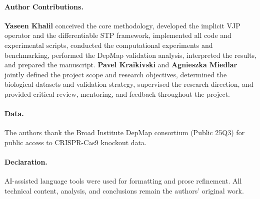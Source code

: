 \documentclass[11pt,a4paper]{article}
\begin{document}
\paragraph{Author Contributions.} \textbf{Yaseen Khalil} conceived the core methodology, developed the implicit VJP operator and the differentiable STP framework, implemented all code and experimental scripts, conducted the computational experiments and benchmarking, performed the DepMap validation analysis, interpreted the results, and prepared the manuscript. \textbf{Pavel Kraikivski} and \textbf{Agnieszka Miedlar} jointly defined the project scope and research objectives, determined the biological datasets and validation strategy, supervised the research direction, and provided critical review, mentoring, and feedback throughout the project.

\paragraph{Data.} The authors thank the Broad Institute DepMap consortium (Public 25Q3) for public access to CRISPR-Cas9 knockout data.

\paragraph{Declaration.} AI-assisted language tools were used for formatting and prose refinement. All technical content, analysis, and conclusions remain the authors' original work.


\end{document}
